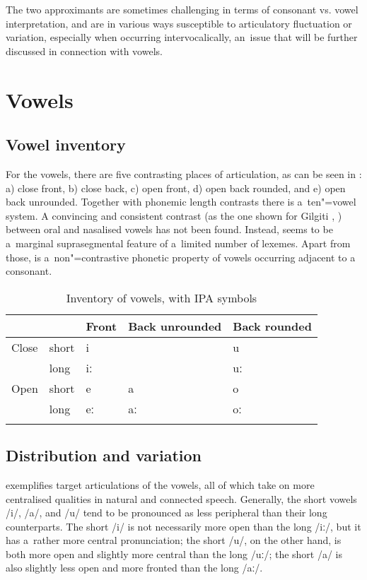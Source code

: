 The two approximants are sometimes challenging in terms of consonant vs. vowel interpretation, and are in various ways susceptible to articulatory fluctuation or variation, especially when occurring intervocalically, an~issue that will be further discussed in connection with vowels.


\section{Vowels}
\label{sec:3-2}

\subsection{Vowel inventory}

For the vowels, there are five contrasting places of articulation, as can be seen in : a) close front, b) close back, c) open front, d) open back rounded, and e) open back unrounded. Together with phonemic length contrasts there is a~ten"=vowel system. A convincing and consistent contrast (as the one shown for Gilgiti , \citealt[19]{radloff1999}) between oral and nasalised vowels has not been found. Instead,  seems to be a~marginal suprasegmental feature of a~limited number of lexemes. Apart from those,  is a~non"=contrastive phonetic property of vowels occurring adjacent to a~ consonant. 



\begin{table}[ht]
\caption{Inventory of vowels, with IPA symbols}
\begin{tabularx}{\textwidth}{ Q Q Q Q Q }
\lsptoprule
&
&
Front
&
Back unrounded &
Back rounded \\\hline
Close &
short &
i &
&
u\\
&
long &
iː &
&
uː\\
Open &
short &
e &
a &
o\\
&
long &
eː &
aː &
oː\\\lspbottomrule
\end{tabularx}
\label{tab:3-3}
\end{table}

\subsection{Distribution and variation}
\label{subsec:3-2-1}

 exemplifies target articulations of the vowels, all of which take on more centralised qualities in natural and connected speech. Generally, the short vowels /i/, /a/, and /u/ tend to be pronounced as less peripheral than their long counterparts. The short /i/ is not necessarily more open than the long /iː/, but it has a~rather more central pronunciation; the short /u/, on the other hand, is both more open and slightly more central than the long /uː/; the short /a/ is also slightly less open and more fronted than the long /aː/. 


